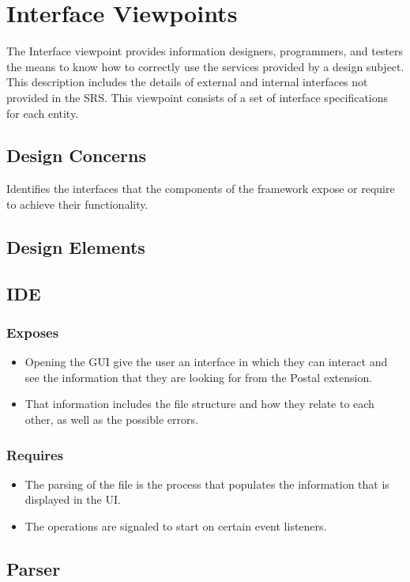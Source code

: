 \documentclass[letterpaper,10pt,titlepage,draftclsnofoot,onecolumn,onesided] {IEEEtran}
\begin{document}
		
		
\section{Interface Viewpoints}
The Interface viewpoint provides information designers, programmers, and testers the means to know how
to correctly use the services provided by a design subject. This description includes the details of external
and internal interfaces not provided in the SRS. This viewpoint consists of a set of interface specifications
for each entity. 
\subsection{Design Concerns}
Identifies the interfaces that the components of the framework expose or require to achieve their
functionality. 
\subsection{Design Elements}


	\subsection{IDE}
		\subsubsection{Exposes}
			\begin{itemize}
			\item Opening the GUI give the user an interface in which they can interact and see the information that they are looking for from the Postal extension.
			\item That information includes the file structure and how they relate to each other, as well as the possible errors. 
			\end{itemize}
		\subsubsection{Requires}
			\begin{itemize}
			\item The parsing of the file is the process that populates the information that is displayed in the UI.
			\item The operations are signaled to start on certain event listeners.
			\end{itemize}
			
	\subsection{Parser}
\end{document}
